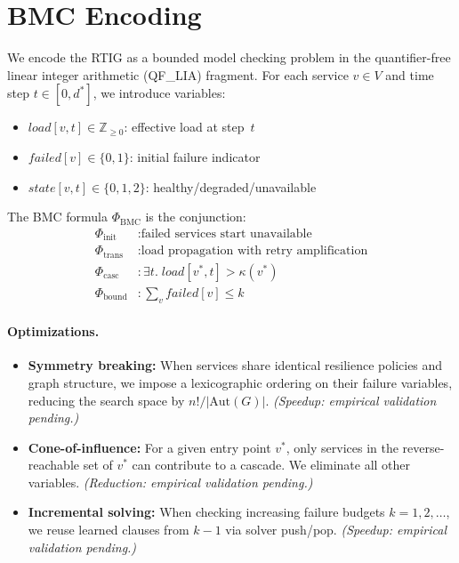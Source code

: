 \documentclass[10pt,twocolumn]{article}
\newcommand{\rtig}{RTIG\xspace}
\begin{document}
\section{BMC Encoding}
\label{sec:bmc}

We encode the \rtig as a bounded model checking problem in the quantifier-free
linear integer arithmetic (QF\_LIA) fragment. For each service $v \in V$ and
time step $t \in [0, d^*]$, we introduce variables:

\begin{itemize}[nosep]
\item $\mathit{load}[v,t] \in \mathbb{Z}_{\ge 0}$: effective load at step~$t$
\item $\mathit{failed}[v] \in \{0,1\}$: initial failure indicator
\item $\mathit{state}[v,t] \in \{0,1,2\}$: healthy/degraded/unavailable
\end{itemize}

The BMC formula $\Phi_{\mathrm{BMC}}$ is the conjunction:
\begin{align}
\Phi_{\mathrm{init}} &: \text{failed services start unavailable} \label{eq:init} \\
\Phi_{\mathrm{trans}} &: \text{load propagation with retry amplification} \label{eq:trans} \\
\Phi_{\mathrm{casc}} &: \exists t.\; \mathit{load}[v^*, t] > \kappa(v^*) \label{eq:casc} \\
\Phi_{\mathrm{bound}} &: \sum_v \mathit{failed}[v] \le k \label{eq:bound}
\end{align}

\paragraph{Optimizations.}
\begin{itemize}[nosep]
\item \textbf{Symmetry breaking:} When services share identical resilience
  policies and graph structure, we impose a lexicographic ordering on their
  failure variables, reducing the search space by $n!/|\mathrm{Aut}(G)|$.
  \emph{(Speedup: empirical validation pending.)}

\item \textbf{Cone-of-influence:} For a given entry point $v^*$, only services
  in the reverse-reachable set of $v^*$ can contribute to a cascade. We
  eliminate all other variables.
  \emph{(Reduction: empirical validation pending.)}

\item \textbf{Incremental solving:} When checking increasing failure budgets
  $k = 1, 2, \ldots$, we reuse learned clauses from $k-1$ via solver
  push/pop.
  \emph{(Speedup: empirical validation pending.)}
\end{itemize}
\end{document}

